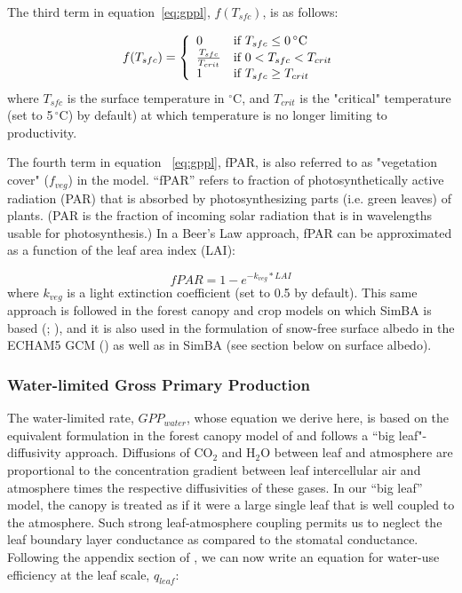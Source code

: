 The third term in equation~\eqref{eq:gppl}, $f(T_{sfc})$, is as follows:

\begin{equation}
f(T_{sfc}) = \left\{ \begin{array}{ll} 
  0 & \mbox{if $T_{sfc} \leq 0\,^{\circ}\mathrm{C}$} \\
  \frac{T_{sfc}}{T_{crit}} & \mbox{if $ 0<T_{sfc}<T_{crit}$} \\
  1 & \mbox{if $T_{sfc} \geq T_{crit}$}
\end{array} \right.
\end{equation}
where $T_{sfc}$ is the surface temperature in $^{\circ}\mathrm{C}$, and $T_{crit}$ is the "critical" temperature (set to 5$\,^{\circ}\mathrm{C}$) by default) at which temperature is no longer limiting to productivity.

The fourth term in equation ~\eqref{eq:gppl}, fPAR, is also referred to as "vegetation cover" ($f_{veg}$) in the model.  ``fPAR'' refers to fraction of photosynthetically active radiation (PAR) that is absorbed by photosynthesizing parts (i.e. green leaves) of plants.  (PAR is the fraction of incoming solar radiation that is in wavelengths usable for photosynthesis.)  In a Beer's Law approach, fPAR can be approximated as a function of the leaf area index (LAI):

\begin{equation}
\label{eq:fPAR}
fPAR = 1 - e^{-k_{veg} * LAI}
\end{equation}
where $k_{veg}$ is a light extinction coefficient (set to 0.5 by default).  This same approach is followed in the forest canopy and crop models on which SimBA is based (\cite{monteith1989}; \cite{dewar1997}), and it is also used in the formulation of snow-free surface albedo in the ECHAM5 GCM (\cite{rechid2009}) as well as in SimBA (see section below on surface albedo).

\subsubsection{Water-limited Gross Primary Production}

The water-limited rate, $GPP_{water}$, whose equation we derive here, is based on the equivalent formulation in the forest canopy model of \cite{dewar1997} and follows a ``big leaf"-diffusivity approach.  Diffusions of CO$_{2}$ and H$_{2}$O between leaf and atmosphere are proportional to the concentration gradient between leaf intercellular air and atmosphere times the respective diffusivities of these gases.  In our ``big leaf'' model, the canopy is treated as if it were a large single leaf that is well coupled to the atmosphere.  Such strong leaf-atmosphere coupling permits us to neglect the leaf boundary layer conductance as compared to the stomatal conductance.  Following the appendix section of \cite{dewar1997}, we can now write an equation for water-use efficiency at the leaf scale, $q_{leaf}$:

